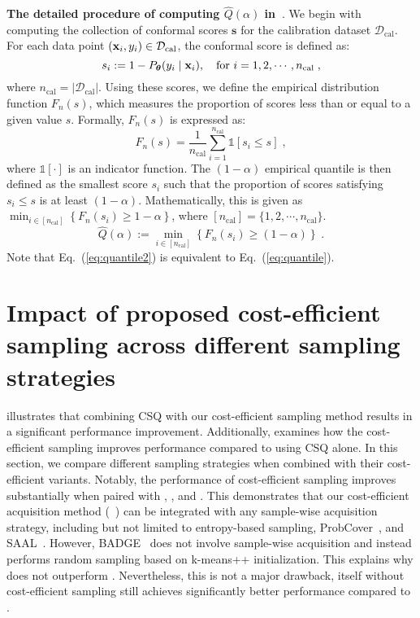 \noindent\textbf{The detailed procedure of computing $\hat{Q}(\alpha)$ in~}.
We begin with computing the collection of conformal scores $\mathbf s$ for the calibration dataset \(\mathcal{D}_\text{cal}\). For each data point \((\mathbf{x}_i, y_i) \in \mathcal{D}_\text{cal}\), the conformal score is defined as:
\begin{equation}
    s_i := 1 - P_{\boldsymbol{\theta}}(y_i \mid \mathbf{x}_i), \quad \text{for } i = 1, 2, \cdots, n_\text{cal} \;,
\end{equation}
where $n_\text{cal} = |\mathcal{D}_\text{cal}|$.
Using these scores, we define the empirical distribution function \(F_n(s)\), which measures the proportion of scores less than or equal to a given value \(s\). Formally, \(F_n(s)\) is expressed as:
\begin{equation}
    F_n(s) = \frac{1}{n_\text{cal}} \sum_{i=1}^{n_\text{cal}} \mathds{1}[s_i \leq s] \;,
\end{equation}
where $\mathds{1}[\cdot]$ is an indicator function.
The $(1-\alpha)$ empirical quantile is then defined as the smallest score $s_i$ such that the proportion of scores satisfying $s_i \leq s$ is at least $(1 - \alpha)$.
Mathematically, this is given as $\min_{i \in [n_\text{cal}]} \left\{ F_n(s_i) \geq 1 - \alpha \right\}$, where $[n_\text{cal}] = \{1, 2, \cdots, n_\text{cal}\}$.
\begin{equation}
    \hat{Q}(\alpha) := \min_{i \in [n_\text{cal}]} \left\{ F_n(s_i) \geq (1 - \alpha) \right\} \;.
    \label{eq:quantile2}
\end{equation}
Note that Eq.~(\ref{eq:quantile2}) is equivalent to Eq.~(\ref{eq:quantile}).

\section{Impact of proposed cost-efficient sampling across different sampling strategies}




 illustrates that combining CSQ with our cost-efficient sampling method results in a significant performance improvement. Additionally,  examines how the cost-efficient sampling improves performance compared to using CSQ alone. In this section, we compare different sampling strategies when combined with their cost-efficient variants. Notably, the performance of cost-efficient sampling improves substantially when paired with , , and . This demonstrates that our cost-efficient acquisition method (~) can be integrated with any sample-wise acquisition strategy, including but not limited to entropy-based sampling, ProbCover~\citep{yehuda2022active}, and SAAL~\citep{kim2023saal}. However, BADGE~\citep{ash2019deep} does not involve sample-wise acquisition and instead performs random sampling based on k-means++ initialization. This explains why  does not outperform . 
Nevertheless, this is not a major drawback,  itself without cost-efficient sampling still achieves significantly better performance compared to .



